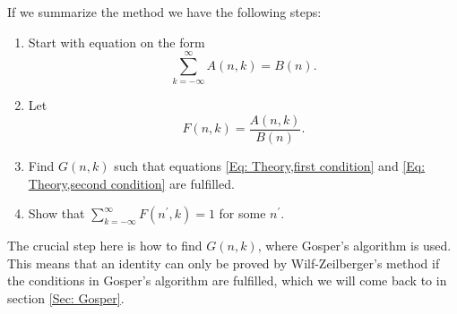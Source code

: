 If we summarize the method we have the following steps:
\begin{enumerate}
  \item Start with equation on the form $$\sum_{k=-\infty}^\infty A(n,k) = B(n).$$
  \item Let $$F(n,k)=\frac{A(n,k)}{B(n)}.$$
  \item Find $G(n,k)$ such that equations \ref{Eq: Theory,first condition} and \ref{Eq: Theory,second condition} are fulfilled.
  \item Show that $\sum_{k=-\infty}^\infty F(n^\prime,k)=1$ for some $n^\prime$.
\end{enumerate}
The crucial step here is how to find $G(n,k)$, where Gosper's algorithm is used. This means that an identity can only be proved by Wilf-Zeilberger's method if the conditions in Gosper's algorithm are fulfilled, which we will come back to in section \ref{Sec: Gosper}.

